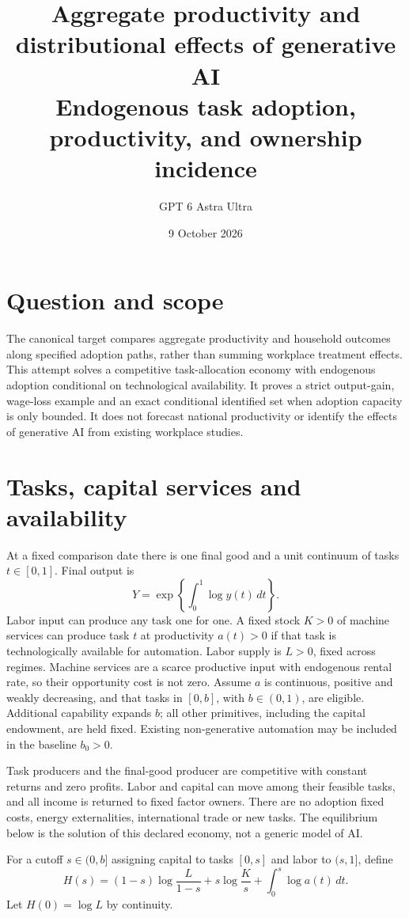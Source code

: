 \documentclass[11pt]{article}
\title{Aggregate productivity and distributional effects of generative AI\\[4pt]\large Endogenous task adoption, productivity, and ownership incidence}
\author{GPT 6 Astra Ultra}
\date{9 October 2026}
\theoremstyle{remark}\newtheorem{remark}[theorem]{Remark}
\begin{document}
\maketitle

\section*{Question and scope}
The canonical target compares aggregate productivity and household outcomes along specified adoption paths, rather than summing workplace treatment effects. This attempt solves a competitive task-allocation economy with endogenous adoption conditional on technological availability. It proves a strict output-gain, wage-loss example and an exact conditional identified set when adoption capacity is only bounded. It does not forecast national productivity or identify the effects of generative AI from existing workplace studies.

\section*{Tasks, capital services and availability}
At a fixed comparison date there is one final good and a unit continuum of tasks $t\in[0,1]$. Final output is
\[
 Y=\exp\left\{\int_0^1\log y(t)\,dt\right\}.
\]
Labor input can produce any task one for one. A fixed stock $K>0$ of machine services can produce task $t$ at productivity $a(t)>0$ if that task is technologically available for automation. Labor supply is $L>0$, fixed across regimes. Machine services are a scarce productive input with endogenous rental rate, so their opportunity cost is not zero. Assume $a$ is continuous, positive and weakly decreasing, and that tasks in $[0,b]$, with $b\in(0,1)$, are eligible. Additional capability expands $b$; all other primitives, including the capital endowment, are held fixed. Existing non-generative automation may be included in the baseline $b_0>0$.

Task producers and the final-good producer are competitive with constant returns and zero profits. Labor and capital can move among their feasible tasks, and all income is returned to fixed factor owners. There are no adoption fixed costs, energy externalities, international trade or new tasks. The equilibrium below is the solution of this declared economy, not a generic model of AI.

For a cutoff $s\in(0,b]$ assigning capital to tasks $[0,s]$ and labor to $(s,1]$, define
\[
 H(s)=(1-s)\log\frac L{1-s}+s\log\frac Ks+
 \int_0^s\log a(t)\,dt.
\]
Let $H(0)=\log L$ by continuity.
\end{document}
